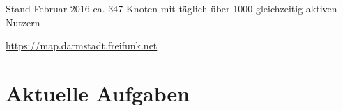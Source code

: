 \documentclass[10pt]{beamer}
\begin{document}
    \begin{frame}{Stand Februar 2016}
      ca. 347 Knoten mit täglich über 1000 gleichzeitig aktiven Nutzern
      \begin{center}
        \vfill
        \begin{center}
        \end{center}
        \vfill
        \url{https://map.darmstadt.freifunk.net}
      \end{center}
    \end{frame}

  \section{Aktuelle Aufgaben}
\end{document}

